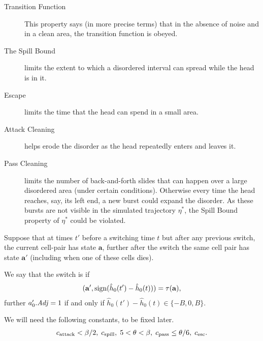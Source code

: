 \documentclass[11pt]{memoir}
\theoremstyle{definition} %
\renewcommand{\le}{\leq}
\renewcommand{\ge}{\geq}
\renewcommand{\vek}[1]{\mathbf{#1}}
\newcommand{\fld}[1]{\ensuremath{\textit{#1\/}}}
\def\B{B}
\newcommand{\va}{\vek{a}}
\newcommand{\hc}{\hat h}
\newcommand{\Adj}{\fld{Adj}}
\newcommand{\cns}[1]{c_{\textrm{\upshape #1}}}
\newcommand{\CAtt}{\cns{attack}}
\newcommand{\CEsc}{\cns{esc}}
\newcommand{\CPass}{\cns{pass}}
\newcommand{\CSpill}{\cns{spill}}
\begin{document}
\begin{description}
\item[Transition Function] This property says (in more precise terms)
that in the absence of noise and in a clean area, the
transition function is obeyed.

\item[The Spill Bound] limits the extent to which a disordered interval can spread while
the head is in it.

\item[Escape] limits the time that the head can spend in a small area.

\item[Attack Cleaning] helps erode the disorder as the head repeatedly enters and leaves it.

\item[Pass Cleaning] limits the number of back-and-forth slides that can happen over a
large disordered area (under certain conditions).
Otherwise every time the head reaches, say, its left end,
a new burst could expand the disorder.
As these bursts are not visible in the simulated trajectory \( \eta^{*} \),
the Spill Bound property of \( \eta^{*} \) could be violated.

\end{description}

\begin{definition}
Suppose that at times \( t' \) before a switching time \( t \) but after 
any previous switch, the current cell-pair has state \( \va \),
further after the switch the same cell pair has state \( \va' \)
(including when one of these cells dies).

We say that the switch is  if
\begin{align*}
 (\va',\sign(\hc_{0}(t')-\hc_{0}(t))) =  \tau(\va),
 \end{align*}
further \( a'_{0}.\Adj=1 \) if and only if \( \hc_{0}(t')-\hc_{0}(t)\in\{-\B,0,\B\} \).
\end{definition}

We will need the following constants, to be fixed later.
\begin{align}\label{eq:cns.traj}
  \CAtt<\beta/2,\;
  \CSpill,\;
  5<\theta<\beta,\;
  \CPass\le\theta/6,\;
  \CEsc.
 \end{align}
\end{document}
